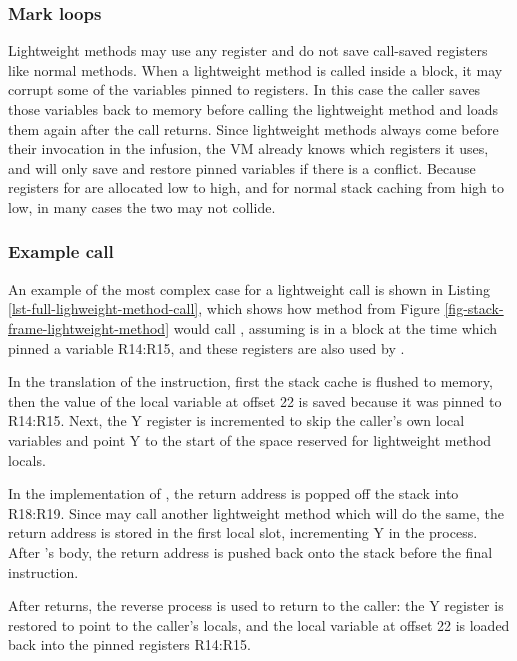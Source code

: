 \subsubsection{Mark loops}
Lightweight methods may use any register and do not save call-saved registers like normal methods. When a lightweight method is called inside a  block, it may corrupt some of the variables pinned to registers. In this case the caller saves those variables back to memory before calling the lightweight method and loads them again after the call returns. Since lightweight methods always come before their invocation in the infusion, the VM already knows which registers it uses, and will only save and restore pinned variables if there is a conflict. Because registers for  are allocated low to high, and for normal stack caching from high to low, in many cases the two may not collide.

\subsubsection{Example call}
An example of the most complex case for a lightweight call is shown in Listing \ref{lst-full-lighweight-method-call}, which shows how method  from Figure \ref{fig-stack-frame-lightweight-method} would call , assuming  is in a  block at the time which pinned a variable R14:R15, and these registers are also used by .

In the translation of the  instruction, first the stack cache is flushed to memory, then the value of the local variable at offset 22 is saved because it was pinned to R14:R15. Next, the Y register is incremented to skip the caller's own local variables and point Y to the start of the space reserved for lightweight method locals.

In the implementation of , the return address is popped off the stack into R18:R19. Since  may call another lightweight method which will do the same, the return address is stored in the first local slot, incrementing Y in the process. After 's body, the return address is pushed back onto the stack before the final  instruction.

After  returns, the reverse process is used to return to the caller: the Y register is restored to point to the caller's locals, and the local variable at offset 22 is loaded back into the pinned registers R14:R15.

